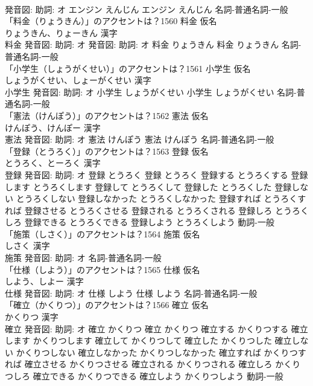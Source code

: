 \documentclass[8pt]{extreport}
\begin{document}
\begin{CJK}{UTF8}{min}
\\	発音図: 助詞: オ	エンジン えんじん		エンジン えんじん				名詞-普通名詞-一般 
\\	「料金（りょうきん）」のアクセントは？1560	料金 仮名　
\\	りょうきん、りょーきん 漢字　
\\	料金 発音図: 助詞: オ 発音図: 助詞: オ	料金 りょうきん		料金 りょうきん				名詞-普通名詞-一般 
\\	「小学生（しょうがくせい）」のアクセントは？1561	小学生 仮名　
\\	しょうがくせい、しょーがくせい 漢字　
\\	小学生 発音図: 助詞: オ	小学生 しょうがくせい		小学生 しょうがくせい				名詞-普通名詞-一般 
\\	「憲法（けんぽう）」のアクセントは？1562	憲法 仮名　
\\	けんぽう、けんぽー 漢字　
\\	憲法 発音図: 助詞: オ	憲法 けんぽう		憲法 けんぽう				名詞-普通名詞-一般 
\\	「登録（とうろく）」のアクセントは？1563	登録 仮名　
\\	とうろく、とーろく 漢字　
\\	登録 発音図: 助詞: オ	登録 とうろく		登録 とうろく 登録する とうろくする 登録します とうろくします 登録して とうろくして 登録した とうろくした 登録しない とうろくしない 登録しなかった とうろくしなかった 登録すれば とうろくすれば 登録させる とうろくさせる 登録される とうろくされる 登録しろ とうろくしろ 登録できる とうろくできる 登録しよう とうろくしよう				動詞-一般 
\\	「施策（しさく）」のアクセントは？1564	施策 仮名　
\\	しさく 漢字　
\\	施策 発音図: 助詞: オ							名詞-普通名詞-一般 
\\	「仕様（しよう）」のアクセントは？1565	仕様 仮名　
\\	しよう、しよー 漢字　
\\	仕様 発音図: 助詞: オ	仕様 しよう		仕様 しよう				名詞-普通名詞-一般 
\\	「確立（かくりつ）」のアクセントは？1566	確立 仮名　
\\	かくりつ 漢字　
\\	確立 発音図: 助詞: オ	確立 かくりつ		確立 かくりつ 確立する かくりつする 確立します かくりつします 確立して かくりつして 確立した かくりつした 確立しない かくりつしない 確立しなかった かくりつしなかった 確立すれば かくりつすれば 確立させる かくりつさせる 確立される かくりつされる 確立しろ かくりつしろ 確立できる かくりつできる 確立しよう かくりつしよう				動詞-一般 

\end{CJK}
\end{document}
